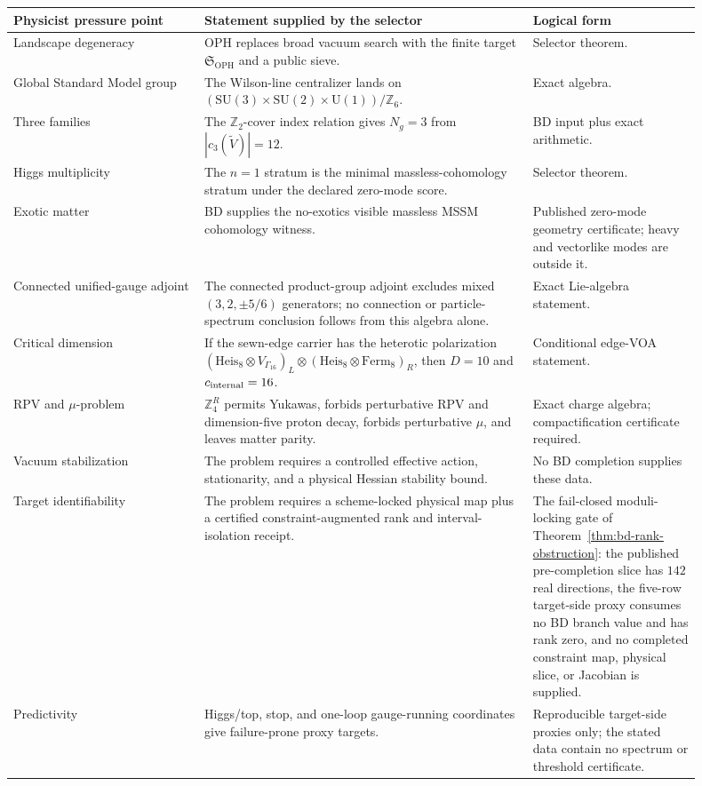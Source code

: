 \documentclass[11pt]{article}
\theoremstyle{remark}
\theoremstyle{plain}
\newcommand{\OPH}{\mathrm{OPH}}
\newcommand{\SU}{\mathrm{SU}}
\newcommand{\U}{\mathrm{U}}
\newcommand{\Z}{\mathbb Z}
\newcommand{\ZfourR}{\mathbb Z_4^R}
\begin{document}
\begin{longtable}{L{0.25\linewidth}L{0.43\linewidth}L{0.22\linewidth}}
\toprule
\textbf{Physicist pressure point} & \textbf{Statement supplied by the selector} & \textbf{Logical form} \\
\midrule
Landscape degeneracy & OPH replaces broad vacuum search with the finite target
\(\mathfrak S_{\OPH}\) and a public sieve. & Selector theorem. \\
Global Standard Model group & The Wilson-line centralizer lands on
\((\SU(3)\times\SU(2)\times\U(1))/\Z_6\). & Exact algebra. \\
Three families & The \(\Z_2\)-cover index relation gives \(N_g=3\) from
\(|c_3(\widetilde V)|=12\). & BD input plus exact arithmetic. \\
Higgs multiplicity & The \(n=1\) stratum is the minimal massless-cohomology stratum under the
declared zero-mode score. & Selector theorem. \\
Exotic matter & BD supplies the no-exotics visible massless MSSM cohomology witness. &
Published zero-mode geometry certificate; heavy and vectorlike modes are outside it. \\
Connected unified-gauge adjoint & The connected product-group adjoint excludes mixed
\((3,2,\pm5/6)\) generators; no connection or particle-spectrum conclusion follows from this
algebra alone. & Exact Lie-algebra statement. \\
Critical dimension & If the sewn-edge carrier has the heterotic polarization
\((\mathrm{Heis}_8\otimes V_{\Gamma_{16}})_L\otimes
(\mathrm{Heis}_8\otimes\mathrm{Ferm}_8)_R\), then \(D=10\) and
\(c_{\rm internal}=16\). & Conditional edge-VOA statement. \\
RPV and \(\mu\)-problem & \(\ZfourR\) permits Yukawas, forbids perturbative RPV and
dimension-five proton decay, forbids perturbative \(\mu\), and leaves matter parity. & Exact
charge algebra; compactification certificate required. \\
Vacuum stabilization & The problem requires a controlled effective action, stationarity, and a
physical Hessian stability bound. & No BD completion supplies these data. \\
Target identifiability & The problem requires a scheme-locked physical map plus a certified
constraint-augmented rank and interval-isolation receipt. & The fail-closed moduli-locking gate of
Theorem~\ref{thm:bd-rank-obstruction}: the published
pre-completion slice has \(142\) real directions, the five-row target-side proxy consumes no BD
branch value and has rank zero, and no completed constraint map, physical slice, or Jacobian is
supplied. \\
Predictivity & Higgs/top, stop, and one-loop gauge-running coordinates give failure-prone proxy
targets. & Reproducible target-side proxies only; the stated data contain no spectrum or threshold certificate. \\
\bottomrule
\end{longtable}
\end{document}
